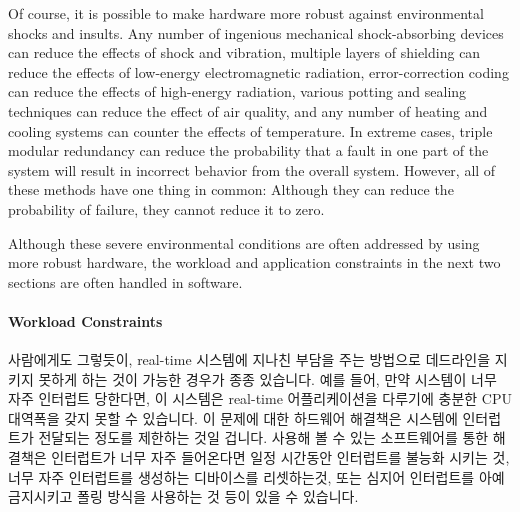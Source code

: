 Of course, it is possible to make hardware more robust against
environmental shocks and insults.
Any number of ingenious mechanical shock-absorbing devices can reduce the
effects of shock and vibration, multiple layers of shielding can reduce
the effects of low-energy electromagnetic radiation, error-correction
coding can reduce the effects of high-energy radiation, various potting
and sealing techniques can reduce the effect of air quality, and any
number of heating and cooling systems can counter the effects of temperature.
In extreme cases, triple modular redundancy can reduce the probability that
a fault in one part of the system will result in incorrect behavior from
the overall system.
However, all of these methods have one thing in common:  Although they
can reduce the probability of failure, they cannot reduce it to zero.

Although these severe environmental conditions are often addressed by using
more robust hardware, the
workload and application constraints in the next two sections are often
handled in software.
\fi

\paragraph{Workload Constraints}
\label{sec:advsync:Workload Constraints}

사람에게도 그렇듯이, real-time 시스템에 지나친 부담을 주는 방법으로 데드라인을
지키지 못하게 하는 것이 가능한 경우가 종종 있습니다.
예를 들어, 만약 시스템이 너무 자주 인터럽트 당한다면, 이 시스템은 real-time
어플리케이션을 다루기에 충분한 CPU 대역폭을 갖지 못할 수 있습니다.
이 문제에 대한 하드웨어 해결책은 시스템에 인터럽트가 전달되는 정도를 제한하는
것일 겁니다.
사용해 볼 수 있는 소프트웨어를 통한 해결책은 인터럽트가 너무 자주 들어온다면
일정 시간동안 인터럽트를 불능화 시키는 것, 너무 자주 인터럽트를 생성하는
디바이스를 리셋하는것, 또는 심지어 인터럽트를 아예 금지시키고 폴링 방식을
사용하는 것 등이 있을 수 있습니다.

